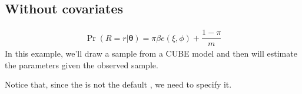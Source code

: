 \documentclass[letterpaper,10pt,english]{sphinxmanual}
\begin{document}
\subsection{Without covariates}
\label{\detokenize{manual:cube-without-covariates}}\label{\detokenize{manual:id196}}
\sphinxAtStartPar
{}
\begin{equation*}
\begin{split}\Pr(R=r|\pmb{\theta}) = \pi \beta e(\xi,\phi)+\dfrac{1-\pi}{m}\end{split}
\end{equation*}
\sphinxAtStartPar
In this example, we’ll draw a sample from a CUBE model and then
will estimate the parameters given the observed sample.

\sphinxAtStartPar
Notice that, since the  is not the default , we need to specify it.
\def\sphinxLiteralBlockLabel{\label{\detokenize{manual:id290}}}
\end{document}
